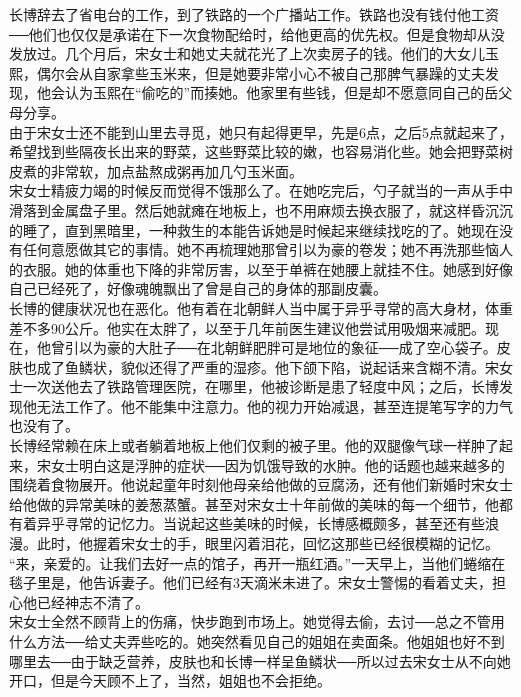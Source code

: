 长博辞去了省电台的工作，到了铁路的一个广播站工作。铁路也没有钱付他工资──他们也仅仅是承诺在下一次食物配给时，给他更高的优先权。但是食物却从没发放过。几个月后，宋女士和她丈夫就花光了上次卖房子的钱。他们的大女儿玉熙，偶尔会从自家拿些玉米来，但是她要非常小心不被自己那脾气暴躁的丈夫发现，他会认为玉熙在“偷吃的”而揍她。他家里有些钱，但是却不愿意同自己的岳父母分享。\\

由于宋女士还不能到山里去寻觅，她只有起得更早，先是6点，之后5点就起来了，希望找到些隔夜长出来的野菜，这些野菜比较的嫩，也容易消化些。她会把野菜树皮煮的非常软，加点盐熬成粥再加几勺玉米面。\\

宋女士精疲力竭的时候反而觉得不饿那么了。在她吃完后，勺子就当的一声从手中滑落到金属盘子里。然后她就瘫在地板上，也不用麻烦去换衣服了，就这样昏沉沉的睡了，直到黑暗里，一种救生的本能告诉她是时候起来继续找吃的了。她现在没有任何意愿做其它的事情。她不再梳理她那曾引以为豪的卷发；她不再洗那些恼人的衣服。她的体重也下降的非常厉害，以至于单裤在她腰上就挂不住。她感到好像自己已经死了，好像魂魄飘出了曾是自己的身体的那副皮囊。\\

长博的健康状况也在恶化。他有着在北朝鲜人当中属于异乎寻常的高大身材，体重差不多90公斤。他实在太胖了，以至于几年前医生建议他尝试用吸烟来减肥。现在，他曾引以为豪的大肚子──在北朝鲜肥胖可是地位的象征──成了空心袋子。皮肤也成了鱼鳞状，貌似还得了严重的湿疹。他下颌下陷，说起话来含糊不清。宋女士一次送他去了铁路管理医院，在哪里，他被诊断是患了轻度中风；之后，长博发现他无法工作了。他不能集中注意力。他的视力开始减退，甚至连提笔写字的力气也没有了。\\

长博经常赖在床上或者躺着地板上他们仅剩的被子里。他的双腿像气球一样肿了起来，宋女士明白这是浮肿的症状──因为饥饿导致的水肿。他的话题也越来越多的围绕着食物展开。他说起童年时刻他母亲给他做的豆腐汤，还有他们新婚时宋女士给他做的异常美味的姜葱蒸蟹。甚至对宋女士十年前做的美味的每一个细节，他都有着异乎寻常的记忆力。当说起这些美味的时候，长博感概颇多，甚至还有些浪漫。此时，他握着宋女士的手，眼里闪着泪花，回忆这那些已经很模糊的记忆。\\

“来，亲爱的。让我们去好一点的馆子，再开一瓶红酒。”一天早上，当他们蜷缩在毯子里是，他告诉妻子。他们已经有3天滴米未进了。宋女士警惕的看着丈夫，担心他已经神志不清了。\\

宋女士全然不顾背上的伤痛，快步跑到市场上。她觉得去偷，去讨──总之不管用什么方法──给丈夫弄些吃的。她突然看见自己的姐姐在卖面条。他姐姐也好不到哪里去──由于缺乏营养，皮肤也和长博一样呈鱼鳞状──所以过去宋女士从不向她开口，但是今天顾不上了，当然，姐姐也不会拒绝。\\

